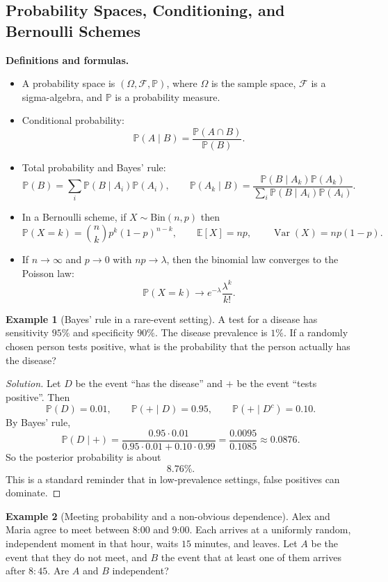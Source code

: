 \documentclass[11pt]{article}
\theoremstyle{definition}
\newtheorem{example}{Example}[section]
\newcommand{\E}{\mathbb{E}}
\newcommand{\Var}{\operatorname{Var}}
\begin{document}
\subsection{Probability Spaces, Conditioning, and Bernoulli Schemes}
\textbf{Definitions and formulas.}
\begin{itemize}
    \item A probability space is $(\Omega,\mathcal{F},\mathbb{P})$, where $\Omega$ is the sample space, $\mathcal{F}$ is a sigma-algebra, and $\mathbb{P}$ is a probability measure.
    \item Conditional probability:
    \[
        \mathbb{P}(A\mid B)=\frac{\mathbb{P}(A\cap B)}{\mathbb{P}(B)}.
    \]
    \item Total probability and Bayes' rule:
    \[
        \mathbb{P}(B)=\sum_i \mathbb{P}(B\mid A_i)\mathbb{P}(A_i),
        \qquad
        \mathbb{P}(A_k\mid B)=\frac{\mathbb{P}(B\mid A_k)\mathbb{P}(A_k)}{\sum_i \mathbb{P}(B\mid A_i)\mathbb{P}(A_i)}.
    \]
    \item In a Bernoulli scheme, if $X\sim\mathrm{Bin}(n,p)$ then
    \[
        \mathbb{P}(X=k)=\binom{n}{k}p^k(1-p)^{n-k}, \qquad \E[X]=np, \qquad \Var(X)=np(1-p).
    \]
    \item If $n\to\infty$ and $p\to 0$ with $np\to \lambda$, then the binomial law converges to the Poisson law:
    \[
        \mathbb{P}(X=k)\to e^{-\lambda}\frac{\lambda^k}{k!}.
    \]
\end{itemize}

\begin{example}[Bayes' rule in a rare-event setting]
A test for a disease has sensitivity $95\%$ and specificity $90\%$. The disease prevalence is $1\%$. If a randomly chosen person tests positive, what is the probability that the person actually has the disease?
\end{example}

\begin{proof}[Solution]
Let $D$ be the event ``has the disease'' and $+$ be the event ``tests positive''. Then
\[
\mathbb{P}(D)=0.01,
\qquad
\mathbb{P}(+\mid D)=0.95,
\qquad
\mathbb{P}(+\mid D^c)=0.10.
\]
By Bayes' rule,
\[
\mathbb{P}(D\mid +)=\frac{0.95\cdot 0.01}{0.95\cdot 0.01 + 0.10\cdot 0.99}
=\frac{0.0095}{0.1085} \approx 0.0876.
\]
So the posterior probability is about
\[
\boxed{8.76\%}.
\]
This is a standard reminder that in low-prevalence settings, false positives can dominate.
\end{proof}

\begin{example}[Meeting probability and a non-obvious dependence]
Alex and Maria agree to meet between 8:00 and 9:00. Each arrives at a uniformly random, independent moment in that hour, waits $15$ minutes, and leaves. Let $A$ be the event that they do not meet, and $B$ the event that at least one of them arrives after $8{:}45$. Are $A$ and $B$ independent?
\end{example}
\end{document}
